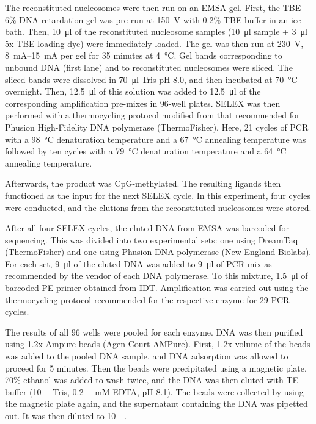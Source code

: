 \documentclass[parskip=full, numbers=noenddot]{scrreprt}
\begin{document}
The reconstituted nucleosomes were then run on an EMSA gel. First, the TBE 6\% DNA retardation gel was pre-run at \SI{150}{\volt} with 0.2\% TBE buffer in an ice bath. Then, \SI{10}{\micro\litre} of the reconstituted nucleosome samples (\SI{10}{\micro\litre} sample + \SI{3}{\micro\litre} 5x TBE loading dye) were immediately loaded. The gel was then run at \SI{230}{\volt}, \SIrange{8}{15}{\milli\ampere} per gel for 35 minutes at \SI{4}{\celsius}. Gel bands corresponding to unbound DNA (first lane) and to reconstituted nucleosomes were sliced. The sliced bands were dissolved in \SI{70}{\micro\litre} Tris pH 8.0, and then incubated at \SI{70}{\celsius} overnight. Then, \SI{12.5}{\micro\litre} of this solution was added to \SI{12.5}{\micro\litre} of the corresponding amplification pre-mixes in 96-well plates. SELEX was then performed with a thermocycling protocol modified from that recommended for Phusion High-Fidelity DNA polymerase (ThermoFisher). Here, 21 cycles of PCR with a \SI{98}{\celsius} denaturation temperature and a \SI{67}{\celsius} annealing temperature was followed by ten cycles with a \SI{79}{\celsius} denaturation temperature and a \SI{64}{\celsius} annealing temperature.

Afterwards, the product was CpG-methylated. The resulting ligands then functioned as the input for the next SELEX cycle. In this experiment, four cycles were conducted, and the elutions from the reconstituted nucleosomes were stored.


After all four SELEX cycles, the eluted DNA from EMSA was barcoded for sequencing. This was divided into two experimental sets: one using DreamTaq (ThermoFisher) and one using Phusion DNA polymerase (New England Biolabs). For each set, \SI{9}{\micro\litre} of the eluted DNA was added to \SI{9}{\micro\litre} of PCR mix as recommended by the vendor of each DNA polymerase. To this mixture, \SI{1.5}{\micro\litre} of barcoded PE primer obtained from IDT. Amplification was carried out using the thermocycling protocol recommended for the respective enzyme for 29 PCR cycles.

The results of all 96 wells were pooled for each enzyme. DNA was then purified using 1.2x Ampure beads (Agen Court AMPure). First, 1.2x volume of the beads was added to the pooled DNA sample, and DNA adsorption was allowed to proceed for 5 minutes. Then the beads were precipitated using a magnetic plate. 70\% ethanol was added to wash twice, and the DNA was then eluted with TE buffer (\SI{10}{\milli\Molar} Tris, \SI{0.2}{\milli\Molar} mM EDTA, pH 8.1). The beads were collected by using the magnetic plate again, and the supernatant containing the DNA was pipetted out. It was then diluted to \SI{10}{\nano\Molar}.
\end{document}
